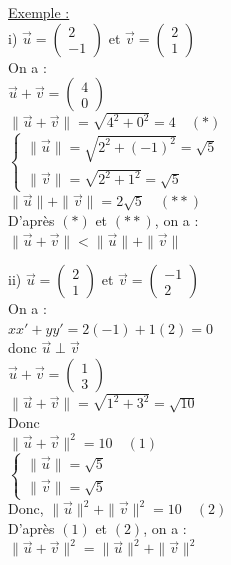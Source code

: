 \documentclass{article}
\begin{document}
\noindent \underline{\color{red}Exemple :} \\
i) $\vec{u} = \begin{pmatrix} 2 \\ -1 \end{pmatrix}$ et $\vec{v} = \begin{pmatrix} 2 \\ 1 \end{pmatrix}$ \\
On a : \\
$\vec{u} + \vec{v} = \begin{pmatrix} 4 \\ 0 \end{pmatrix}$ \\
$\|\vec{u} + \vec{v}\| = \sqrt{4^2 + 0^2} = 4 \quad (*)$ \\
$\begin{cases} 
\|\vec{u}\| = \sqrt{2^2 + (-1)^2} = \sqrt{5} \\ 
\|\vec{v}\| = \sqrt{2^2 + 1^2} = \sqrt{5} 
\end{cases}$ \\
$\|\vec{u}\| + \|\vec{v}\| = 2\sqrt{5} \quad (**)$ \\
D'après $(*)$ et $(**)$, on a : \\
$\|\vec{u} + \vec{v}\| < \|\vec{u}\| + \|\vec{v}\|$

\noindent ii) $\vec{u} = \begin{pmatrix} 2 \\ 1 \end{pmatrix}$ et $\vec{v} = \begin{pmatrix} -1 \\ 2 \end{pmatrix}$ \\
On a : \\
$x x' + y y' = 2(-1) + 1(2) = 0$ \\
donc $\vec{u} \perp \vec{v}$ \\
$\vec{u} + \vec{v} = \begin{pmatrix} 1 \\ 3 \end{pmatrix}$ \\
$\|\vec{u} + \vec{v}\| = \sqrt{1^2 + 3^2} = \sqrt{10}$ \\
Donc \\
$\|\vec{u} + \vec{v}\|^2 = 10 \quad (1)$ \\
$\begin{cases} 
\|\vec{u}\| = \sqrt{5} \\ 
\|\vec{v}\| = \sqrt{5} 
\end{cases}$ \\
Donc, $\|\vec{u}\|^2 + \|\vec{v}\|^2 = 10 \quad (2)$ \\
D'après $(1)$ et $(2)$, on a : \\
$\|\vec{u} + \vec{v}\|^2 = \|\vec{u}\|^2 + \|\vec{v}\|^2$
\end{document}
